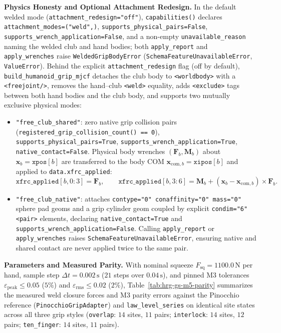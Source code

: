 \documentclass[11pt,a4paper]{article}
\begin{document}
\textbf{Physics Honesty and Optional Attachment Redesign.}
In the default welded mode (\texttt{attachment\_redesign="off"}), \texttt{capabilities()} declares \texttt{attachment\_modes=("weld",)}, \texttt{supports\_physical\_pairs=False}, \texttt{supports\_wrench\_application=False}, and a non-empty \texttt{unavailable\_reason} naming the welded club and hand bodies; both \texttt{apply\_report} and \texttt{apply\_wrenches} raise \texttt{WeldedGripBodyError} (\texttt{SchemaFeatureUnavailableError}, \texttt{ValueError}). Behind the explicit \texttt{attachment\_redesign} flag (off by default), \texttt{build\_humanoid\_grip\_mjcf} detaches the club body to \texttt{<worldbody>} with a \texttt{<freejoint/>}, removes the hand--club \texttt{<weld>} equality, adds \texttt{<exclude>} tags between both hand bodies and the club body, and supports two mutually exclusive physical modes:
\begin{itemize}[leftmargin=*,noitemsep]
\item \texttt{"free\_club\_shared"}: zero native grip collision pairs (\texttt{registered\_grip\_collision\_count() == 0}), \texttt{supports\_physical\_pairs=True}, \texttt{supports\_wrench\_application=True}, \texttt{native\_contact=False}. Physical body wrenches $(\mathbf{F}_b, \mathbf{M}_b)$ about $\mathbf{x}_b = \texttt{xpos}[b]$ are transferred to the body COM $\mathbf{x}_{\mathrm{com},b} = \texttt{xipos}[b]$ and applied to \texttt{data.xfrc\_applied}:
\begin{equation}
\texttt{xfrc\_applied}[b, 0\!:\!3] = \mathbf{F}_b, \qquad \texttt{xfrc\_applied}[b, 3\!:\!6] = \mathbf{M}_b + (\mathbf{x}_b - \mathbf{x}_{\mathrm{com},b}) \times \mathbf{F}_b.
\end{equation}
\item \texttt{"free\_club\_native"}: attaches \texttt{contype="0" conaffinity="0" mass="0"} sphere pad geoms and a grip cylinder geom coupled by explicit \texttt{condim="6"} \texttt{<pair>} elements, declaring \texttt{native\_contact=True} and \texttt{supports\_wrench\_application=False}. Calling \texttt{apply\_report} or \texttt{apply\_wrenches} raises \texttt{SchemaFeatureUnavailableError}, ensuring native and shared contact are never applied twice to the same pair.
\end{itemize}

\textbf{Parameters and Measured Parity.}
With nominal squeeze $F_{\mathrm{sq}} = 1100.0\,\mathrm{N}$ per hand, sample step $\Delta t = 0.002\,\mathrm{s}$ ($21$ steps over $0.04\,\mathrm{s}$), and pinned M3 tolerances $\varepsilon_{\mathrm{peak}} \le 0.05$ ($5\%$) and $\varepsilon_{\mathrm{rms}} \le 0.02$ ($2\%$), Table~\ref{tab:hrg-gs-m5-parity} summarizes the measured weld closure forces and M3 parity errors against the Pinocchio reference (\texttt{PinocchioGripAdapter}) and \texttt{law\_level\_series} on identical site states across all three grip styles (\texttt{overlap}: $14$ sites, $11$ pairs; \texttt{interlock}: $14$ sites, $12$ pairs; \texttt{ten\_finger}: $14$ sites, $11$ pairs).
\end{document}
